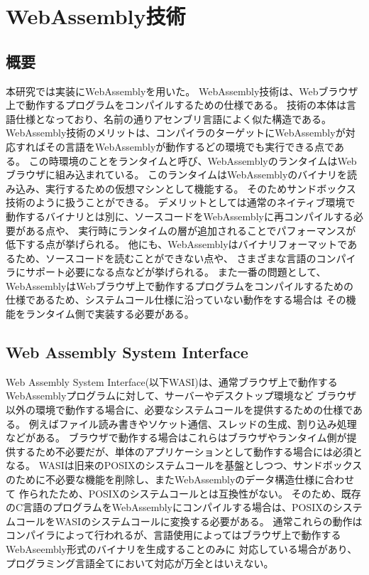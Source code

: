 \documentclass[a4paper,11pt]{jreport}
\begin{document}
\chapter{WebAssembly技術}

\section{概要}

本研究では実装にWebAssemblyを用いた。
WebAssembly技術は、Webブラウザ上で動作するプログラムをコンパイルするための仕様である。
技術の本体は言語仕様となっており、名前の通りアセンブリ言語によく似た構造である。
WebAssembly技術のメリットは、コンパイラのターゲットにWebAssemblyが対応すればその言語をWebAssemblyが動作するどの環境でも実行できる点である。
この時環境のことをランタイムと呼び、WebAssemblyのランタイムはWebブラウザに組み込まれている。
このランタイムはWebAssemblyのバイナリを読み込み、実行するための仮想マシンとして機能する。
そのためサンドボックス技術のように扱うことができる。
デメリットとしては通常のネイティブ環境で動作するバイナリとは別に、ソースコードをWebAssemblyに再コンパイルする必要がある点や、
実行時にランタイムの層が追加されることでパフォーマンスが低下する点が挙げられる。
他にも、WebAssemblyはバイナリフォーマットであるため、ソースコードを読むことができない点や、
さまざまな言語のコンパイラにサポート必要になる点などが挙げられる。
また一番の問題として、WebAssemblyはWebブラウザ上で動作するプログラムをコンパイルするための仕様であるため、システムコール仕様に沿っていない動作をする場合は
その機能をランタイム側で実装する必要がある。

\section{Web Assembly System Interface}

Web Assembly System Interface(以下WASI)\cite{wasi}は、通常ブラウザ上で動作するWebAssemblyプログラムに対して、サーバーやデスクトップ環境など
ブラウザ以外の環境で動作する場合に、必要なシステムコールを提供するための仕様である。
例えばファイル読み書きやソケット通信、スレッドの生成、割り込み処理などがある。
ブラウザで動作する場合はこれらはブラウザやランタイム側が提供するため不必要だが、単体のアプリケーションとして動作する場合には必須となる。
WASIは旧来のPOSIXのシステムコールを基盤としつつ、サンドボックスのために不必要な機能を削除し、またWebAssemblyのデータ構造仕様に合わせて
作られたため、POSIXのシステムコールとは互換性がない。
そのため、既存のC言語のプログラムをWebAssemblyにコンパイルする場合は、POSIXのシステムコールをWASIのシステムコールに変換する必要がある。
通常これらの動作はコンパイラによって行われるが、言語使用によってはブラウザ上で動作するWebAseembly形式のバイナリを生成することのみに
対応している場合があり、プログラミング言語全てにおいて対応が万全とはいえない。
\end{document}
